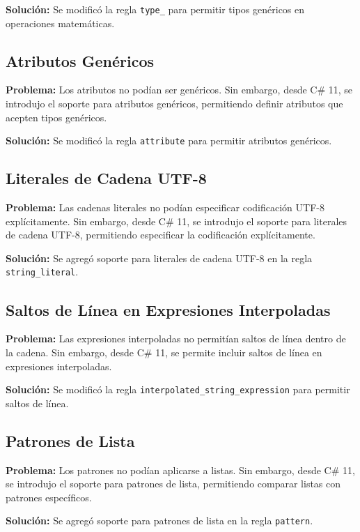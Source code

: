 \textbf{Solución:} Se modificó la regla \texttt{type\_} para permitir tipos genéricos en operaciones matemáticas.

\subsection*{Atributos Genéricos}

\textbf{Problema:} Los atributos no podían ser genéricos. Sin embargo, desde C\# 11, se introdujo el soporte para atributos genéricos, permitiendo definir atributos que acepten tipos genéricos.

\textbf{Solución:} Se modificó la regla \texttt{attribute} para permitir atributos genéricos.

\subsection*{Literales de Cadena UTF-8}

\textbf{Problema:} Las cadenas literales no podían especificar codificación UTF-8 explícitamente. Sin embargo, desde C\# 11, se introdujo el soporte para literales de cadena UTF-8, permitiendo especificar la codificación explícitamente.

\textbf{Solución:} Se agregó soporte para literales de cadena UTF-8 en la regla \texttt{string\_literal}.

\subsection*{Saltos de Línea en Expresiones Interpoladas}

\textbf{Problema:} Las expresiones interpoladas no permitían saltos de línea dentro de la cadena. Sin embargo, desde C\# 11, se permite incluir saltos de línea en expresiones interpoladas.

\textbf{Solución:} Se modificó la regla \texttt{interpolated\_string\_expression} para permitir saltos de línea.

\subsection*{Patrones de Lista}

\textbf{Problema:} Los patrones no podían aplicarse a listas. Sin embargo, desde C\# 11, se introdujo el soporte para patrones de lista, permitiendo comparar listas con patrones específicos.

\textbf{Solución:} Se agregó soporte para patrones de lista en la regla \texttt{pattern}.

